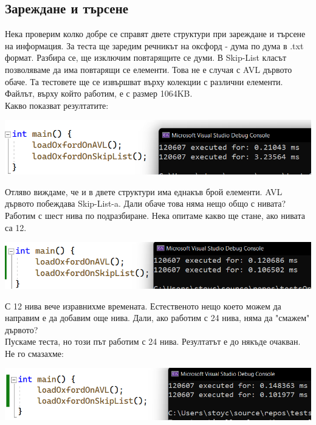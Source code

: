 \documentclass[a4paper,12pt,fleqn]{article}
\begin{document}
	\subsection{Зареждане и търсене}
	Нека проверим колко добре се справят двете структури при зареждане и търсене на информация. За теста ще заредим речникът на оксфорд - дума по дума в .txt формат. Разбира се, ще изключим повтарящите се думи. В Skip-List класът позволяваме да има повтарящи се елементи. Това не е случая с AVL дървото обаче. Та тестовете ще се извършват върху колекции с различни елементи. Файлът, върху който работим, е с размер 1064KB.\\
	Какво показват резултатите:\\
	\begin{center}
	\includegraphics[scale=0.4]{oxford-load.png}\\
	\end{center}
	Отляво виждаме, че и в двете структури има еднакъв брой елементи. AVL дървото побеждава Skip-List-a. Дали обаче това няма нещо общо с нивата? Работим с шест нива по подразбиране. Нека опитаме какво ще стане, ако нивата са 12.\\
	\begin{center}
	\includegraphics[scale=0.4]{oxford-load-2.png}\\
	\end{center}
	С 12 нива вече изравнихме времената. Естественото нещо което можем да направим е да добавим още нива. Дали, ако работим с 24 нива, няма да "смажем" дървото?\\
	Пускаме теста, но този път работим с 24 нива. Резултатът е до някъде очакван. Не го смазахме:\\
	\begin{center}
	\includegraphics[scale=0.4]{oxford-load-3.png}\\
	\end{center}
\end{document}
